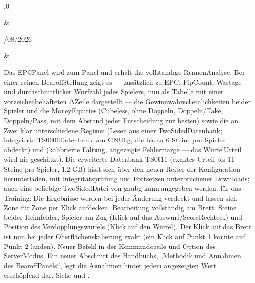 \documentclass[letterpaper,10pt,german]{sphinxmanual}
\begin{document}
\begin{savenotes}
\begin{longtable}{}
\begin{varwidth}[t]{}
\sphinxbeforeendvarwidth
\end{varwidth}%
\\
\sphinxhline\begin{varwidth}[t]{}
.0
\sphinxbeforeendvarwidth
\end{varwidth}%
&\begin{varwidth}[t]{}
/08/2026
\sphinxbeforeendvarwidth
\end{varwidth}%
&\begin{varwidth}[t]{}
\sphinxAtStartPar
Das EPC\sphinxhyphen{}Panel wird zum \sphinxhyphen{}Panel und erhält die vollständige Rennen\sphinxhyphen{}Analyse. Bei einer reinen Bearoff\sphinxhyphen{}Stellung zeigt es — zusätzlich zu EPC, Pip\sphinxhyphen{}Count, Wastage und durchschnittlicher Wurfzahl jedes Spielers, nun als Tabelle mit einer vorzeichenbehafteten Δ\sphinxhyphen{}Zeile dargestellt — die Gewinnwahrscheinlichkeiten beider Spieler und die Money\sphinxhyphen{}Equities (Cubeless, ohne Doppeln, Doppeln/Take, Doppeln/Pass, mit dem Abstand jeder Entscheidung zur besten) sowie die  an. Zwei klar unterschiedene Regime:  (Lesen aus einer Two\sphinxhyphen{}Sided\sphinxhyphen{}Datenbank; integrierte TS\sphinxhyphen{}06\sphinxhyphen{}06\sphinxhyphen{}Datenbank von GNUbg, die bis zu 6 Steine pro Spieler abdeckt) und  (kalibrierte Faltung, angezeigte Fehlermarge — das Würfel\sphinxhyphen{}Urteil wird nie geschätzt). Die erweiterte Datenbank TS\sphinxhyphen{}06\sphinxhyphen{}11 (exaktes Urteil bis 11 Steine pro Spieler, 1,2 GB) lässt sich über den neuen Reiter  der Konfiguration herunterladen, mit Integritätsprüfung und Fortsetzen unterbrochener Downloads; auch eine beliebige Two\sphinxhyphen{}Sided\sphinxhyphen{}\sphinxhyphen{}Datei von gnubg kann angegeben werden.  für das Training: Die Ergebnisse werden bei jeder Änderung verdeckt und lassen sich Zone für Zone per Klick aufdecken. Bearbeitung vollständig am Brett: Steine beider Heimfelder, Spieler am Zug (Klick auf das Auswurf\sphinxhyphen{}/Score\sphinxhyphen{}Rechteck) und Position des Verdopplungswürfels (Klick auf den Würfel). Der Klick auf das Brett ist nun bei jeder Oberflächenskalierung exakt (ein Klick auf Punkt 1 konnte auf Punkt 2 landen). Neuer Befehl  in der Kommandozeile und Option  des Server\sphinxhyphen{}Modus. Ein neuer Abschnitt des Handbuchs, „Methodik und Annahmen des Bearoff\sphinxhyphen{}Panels“, legt die Annahmen hinter jedem angezeigten Wert erschöpfend dar. Siehe {\hyperref[\detokenize{manuel:panneau-epc}]{}} und {\hyperref[\detokenize{manuel:epc-methodologie}]{}}.

\end{varwidth}
\end{longtable}
\end{savenotes}
\end{document}
